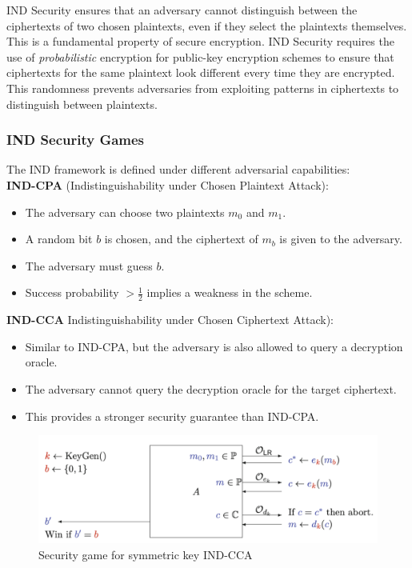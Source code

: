 IND Security ensures that an adversary cannot distinguish between the ciphertexts of two chosen plaintexts, even if they select the plaintexts themselves. This is a fundamental property of secure encryption. IND Security requires the use of \emph{probabilistic} encryption for public-key encryption schemes to ensure that ciphertexts for the same plaintext look different every time they are encrypted. This randomness prevents adversaries from exploiting patterns in ciphertexts to distinguish between plaintexts.

\subsubsection{IND Security Games} 
The IND framework is defined under different adversarial capabilities: \\

\textbf{IND-CPA} (Indistinguishability under Chosen Plaintext Attack):
\begin{itemize}
    \item The adversary can choose two plaintexts $m_0$ and $m_1$.
    \item A random bit $b$ is chosen, and the ciphertext of $m_b$ is given to the adversary.
    \item The adversary must guess $b$.
    \item Success probability $> \frac{1}{2}$ implies a weakness in the scheme.
\end{itemize}

\textbf{IND-CCA} Indistinguishability under Chosen Ciphertext Attack):
\begin{itemize}
    \item Similar to IND-CPA, but the adversary is also allowed to query a decryption oracle.
    \item The adversary cannot query the decryption oracle for the target ciphertext.
    \item This provides a stronger security guarantee than IND-CPA.
\end{itemize}

\begin{figure}[h!]
    \centering
    \includegraphics[scale=0.5]{img/INDcca.png}
    \caption{Security game for symmetric key IND-CCA}
    \label{INDcca}
\end{figure}

